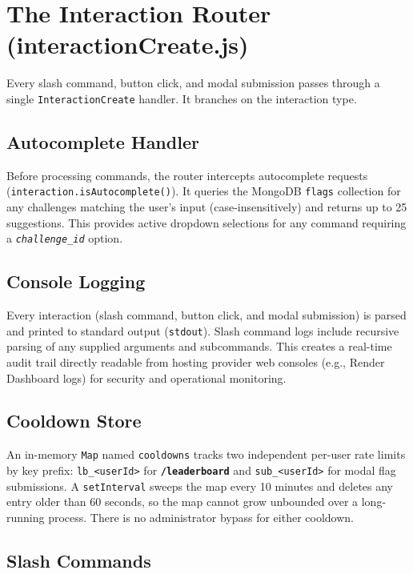 \documentclass[12pt,a4paper]{report}
\newcommand{\cmd}[1]{\texttt{\color{cybercyan}\textbf{#1}}}
\newcommand{\param}[1]{\texttt{\color{cyberdark}\textit{#1}}}
\begin{document}
\chapter{The Interaction Router (interactionCreate.js)}

Every slash command, button click, and modal submission passes through a single
\texttt{InteractionCreate} handler. It branches on the interaction type.

\section{Autocomplete Handler}

Before processing commands, the router intercepts autocomplete requests (\texttt{interaction.isAutocomplete()}).
It queries the MongoDB \texttt{flags} collection for any challenges matching the user's input (case-insensitively)
and returns up to 25 suggestions. This provides active dropdown selections for any command requiring a
\param{challenge\_id} option.

\section{Console Logging}

Every interaction (slash command, button click, and modal submission) is parsed and printed to
standard output (\texttt{stdout}). Slash command logs include recursive parsing of any supplied arguments
and subcommands. This creates a real-time audit trail directly readable from hosting provider web consoles
(e.g., Render Dashboard logs) for security and operational monitoring.

\section{Cooldown Store}

An in-memory \texttt{Map} named \texttt{cooldowns} tracks two independent per-user rate limits by
key prefix: \texttt{lb\_<userId>} for \cmd{/leaderboard} and \texttt{sub\_<userId>} for modal flag
submissions. A \texttt{setInterval} sweeps the map every 10 minutes and deletes any entry older
than 60 seconds, so the map cannot grow unbounded over a long-running process. There is no
administrator bypass for either cooldown.

\section{Slash Commands}
\end{document}

